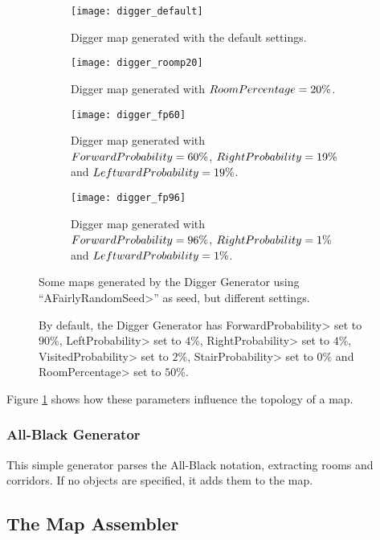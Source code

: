 \begin{figure}[tp]
\centering
\begin{subfigure}[t]{0.48\linewidth}
\texttt{[image: digger\_default]}
\caption{Digger map generated with the default settings.}
\end{subfigure}
\begin{subfigure}[t]{0.48\linewidth}
\texttt{[image: digger\_roomp20]}
\caption{Digger map generated with $Room\-Per\-cent\-age = 20\%$.}
\end{subfigure}
\begin{subfigure}[t]{0.48\linewidth}
\texttt{[image: digger\_fp60]}
\caption{Digger map generated with $For\-ward\-Prob\-a\-bil\-i\-ty = 60\%$, $Right\-Prob\-a\-bil\-i\-ty = 19\%$ and $Left\-ward\-Prob\-a\-bil\-i\-ty = 19\%$.}
\end{subfigure}
\begin{subfigure}[t]{0.48\linewidth}
\texttt{[image: digger\_fp96]}
\caption{Digger map generated with $For\-ward\-Prob\-a\-bil\-i\-ty = 96\%$, $Right\-Prob\-a\-bil\-i\-ty = 1\%$ and $Left\-ward\-Prob\-a\-bil\-i\-ty = 1\%$.}
\end{subfigure}
\caption{Some maps generated by the Digger Generator using ``\<AFairlyRandomSeed>'' as seed, but different settings.}
\caption*{By default, the Digger Generator has \<For\-ward\-Prob\-a\-bil\-i\-ty> set to $90\%$, \<Left\-Prob\-a\-bil\-i\-ty> set to $4\%$, \<Right\-Prob\-a\-bil\-i\-ty> set to $4\%$, \<Vis\-it\-ed\-Prob\-a\-bil\-i\-ty> set to $2\%$, \<Stair\-Prob\-a\-bil\-i\-ty> set to $0\%$ and \<Room\-Per\-cent\-age> set to $50\%$.}
\label{fig:diggers}
\end{figure}

Figure \ref{fig:diggers} shows how these parameters influence the topology of a map.


\subsubsection{All-Black Generator}

This simple generator parses the All-Black notation, extracting rooms and corridors. If no objects are specified, it adds them to the map.


\subsection{The Map Assembler}

